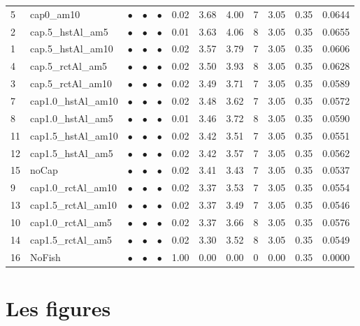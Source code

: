\documentclass[11pt]{book}
\begin{document}
\begin{turn}
\begin{longtable}[t]{llcccccccccc}
5 & cap0\_am10 & $\bullet$ & $\bullet$ & $\bullet$ & 0.02 & 3.68 & 4.00 & 7 & 3.05 & 0.35 & 0.0644\\
2 & cap.5\_hstAl\_am5 & $\bullet$ & $\bullet$ & $\bullet$ & 0.01 & 3.63 & 4.06 & 8 & 3.05 & 0.35 & 0.0655\\
1 & cap.5\_hstAl\_am10 & $\bullet$ & $\bullet$ & $\bullet$ & 0.02 & 3.57 & 3.79 & 7 & 3.05 & 0.35 & 0.0606\\
4 & cap.5\_rctAl\_am5 & $\bullet$ & $\bullet$ & $\bullet$ & 0.02 & 3.50 & 3.93 & 8 & 3.05 & 0.35 & 0.0628\\
3 & cap.5\_rctAl\_am10 & $\bullet$ & $\bullet$ & $\bullet$ & 0.02 & 3.49 & 3.71 & 7 & 3.05 & 0.35 & 0.0589\\
7 & cap1.0\_hstAl\_am10 & $\bullet$ & $\bullet$ & $\bullet$ & 0.02 & 3.48 & 3.62 & 7 & 3.05 & 0.35 & 0.0572\\
8 & cap1.0\_hstAl\_am5 & $\bullet$ & $\bullet$ & $\bullet$ & 0.01 & 3.46 & 3.72 & 8 & 3.05 & 0.35 & 0.0590\\
11 & cap1.5\_hstAl\_am10 & $\bullet$ & $\bullet$ & $\bullet$ & 0.02 & 3.42 & 3.51 & 7 & 3.05 & 0.35 & 0.0551\\
12 & cap1.5\_hstAl\_am5 & $\bullet$ & $\bullet$ & $\bullet$ & 0.02 & 3.42 & 3.57 & 7 & 3.05 & 0.35 & 0.0562\\
15 & noCap & $\bullet$ & $\bullet$ & $\bullet$ & 0.02 & 3.41 & 3.43 & 7 & 3.05 & 0.35 & 0.0537\\
9 & cap1.0\_rctAl\_am10 & $\bullet$ & $\bullet$ & $\bullet$ & 0.02 & 3.37 & 3.53 & 7 & 3.05 & 0.35 & 0.0554\\
13 & cap1.5\_rctAl\_am10 & $\bullet$ & $\bullet$ & $\bullet$ & 0.02 & 3.37 & 3.49 & 7 & 3.05 & 0.35 & 0.0546\\
10 & cap1.0\_rctAl\_am5 & $\bullet$ & $\bullet$ & $\bullet$ & 0.02 & 3.37 & 3.66 & 8 & 3.05 & 0.35 & 0.0576\\
14 & cap1.5\_rctAl\_am5 & $\bullet$ & $\bullet$ & $\bullet$ & 0.02 & 3.30 & 3.52 & 8 & 3.05 & 0.35 & 0.0549\\
16 & NoFish & $\bullet$ & $\bullet$ & $\bullet$ & 1.00 & 0.00 & 0.00 & 0 & 0.00 & 0.35 & 0.0000\\
\bottomrule
\end{longtable}
\endgroup{}
\endgroup{}

\end{turn}
\hypertarget{les-figures}{%
\section{Les figures}\label{les-figures}}
\end{document}
